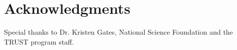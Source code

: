 \section{Acknowledgments}
Special thanks to Dr. Kristen Gates, National Science Foundation and the TRUST program staff.
